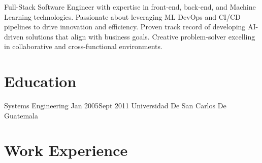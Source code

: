 \documentclass{ExpressiveResume}
\begin{document}
\resumeheader[
    firstname=Eduardo Alejandro Aviles Jimenez,
    email=eduardo.avilesj@gmail.com,
    phone=3996-5277,
    linkedin=eduardoavilesj,
    github=steelcolosus,
    city=Zone 10,
    state=Guatemala,
    fixobjectivespacing=true
]
\begin{flushleft}
    Full-Stack Software Engineer with expertise in front-end, back-end, and Machine Learning technologies.
    Passionate about leveraging ML DevOps and CI/CD pipelines to drive innovation and efficiency. 
    Proven track record of developing AI-driven solutions that align with business goals. 
    Creative problem-solver excelling in collaborative and cross-functional environments.
\end{flushleft}

\section{Education}

\experience
{}
{Systems Engineering}
{Jan 2005}{Sept 2011}
{
    \noindent Universidad De San Carlos De Guatemala 
}
\vspace{8pt}

\section{Work Experience}
\end{document}
